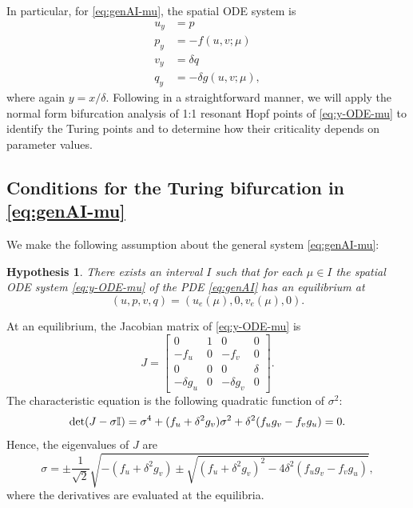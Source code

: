 \documentclass[11pt]{article}
\numberwithin{equation}{section}
\newtheorem{hypothesis}{Hypothesis}[section]
\begin{document}
In particular, for \eqref{eq:genAI-mu}, the spatial ODE system is
%
\begin{equation}  \label{eq:y-ODE-mu}
\begin{split}
    u_y &= p \\
    p_y &= - f(u,v;\mu) \\
    v_y &= \delta q \\
    q_y &= - \delta g(u,v;\mu),
\end{split}
\end{equation}
%
where again $y=x/\delta$.
Following \cite{HI2011} in a straightforward manner, we will apply the normal form bifurcation analysis of 1:1 resonant Hopf points of \eqref{eq:y-ODE-mu} to identify the Turing points and to determine how their criticality depends on parameter values.

\subsection{Conditions for the Turing bifurcation in \texorpdfstring{\eqref{eq:genAI-mu}}{Lg}}
\label{sec:Turing}

We make the following assumption about the general system \eqref{eq:genAI-mu}:
\begin{hypothesis}\label{familyofequilib}
There exists an interval $I$ such that for each $\mu\in I$ the spatial  
ODE system \eqref{eq:y-ODE-mu} of the PDE \eqref{eq:genAI} has an equilibrium at 
\begin{equation}\label{eq:equilib}
(u,p,v,q)=(u_e(\mu),0,v_e(\mu),0).
\end{equation}
\end{hypothesis}
%
At an equilibrium, the Jacobian matrix of \eqref{eq:y-ODE-mu} is
\begin{equation*}
    J = \left[
     \begin{array}{cccc}
     0 & 1 & 0 & 0 \\
     -f_u & 0 & -f_v & 0 \\
     0 & 0 & 0 & \delta \\
     -\delta g_u & 0 & -\delta g_v & 0 
     \end{array}
    \right].
\end{equation*}
The characteristic equation is the following quadratic function of $\sigma^2$:
\begin{equation}\label{eq:detJ-sigmaI}
    {\rm det} ( J - \sigma \mathbb{I})
    = \sigma^4 + (f_u + \delta^2 g_v) \sigma^2 + \delta^2 ( f_u g_v - f_v g_u) = 0.
\end{equation}
Hence, the eigenvalues of $J$ are
\begin{equation}\label{eq:sigma}
    \sigma= \pm \frac{1}{\sqrt{2}} 
    \sqrt{ - (f_u + \delta^2 g_v) \pm \sqrt{ (f_u+\delta^2 g_v)^2 - 4 \delta^2(f_u g_v - f_v g_u)} },
\end{equation}
where the derivatives are evaluated at the equilibria.
\end{document}

